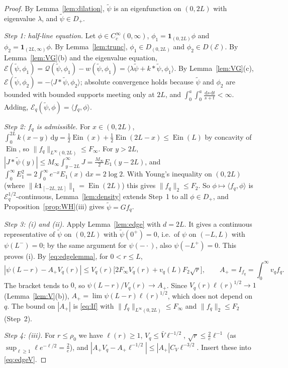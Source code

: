 \documentclass[11pt]{amsart}
\newcommand{\E}{\mathcal{E}}
\newcommand{\one}{\mathbf{1}}
\newcommand{\dd}{\,\mathrm{d}}
\DeclareMathOperator{\Ein}{Ein}
\theoremstyle{definition}
\theoremstyle{remark}
\numberwithin{equation}{section}
\begin{document}
\begin{proof}
By Lemma~\ref{lem:dilation}, $\tilde\psi$ is an eigenfunction on $(0,2L)$ with eigenvalue $\lambda$, and $\tilde\psi\in D_+$.

\emph{Step 1: half-line equation.} Let $\phi\in C_c^\infty(0,\infty)$, $\phi_1=\one_{(0,2L)}\phi$ and $\phi_2=\one_{(2L,\infty)}\phi$. By Lemma~\ref{lem:trunc}, $\phi_1\in D_{(0,2L)}$ and $\phi_2\in D(\E)$. By Lemma~\ref{lem:VG}(b) and the eigenvalue equation, $\E(\tilde\psi,\phi_1)=\mathcal Q(\tilde\psi,\phi_1)-w(\tilde\psi,\phi_1)=\langle\lambda\tilde\psi+k*\tilde\psi,\phi_1\rangle$. By Lemma~\ref{lem:VG}(c), $\E(\tilde\psi,\phi_2)=-\langle J*\tilde\psi,\phi_2\rangle$; absolute convergence holds because $\tilde\psi$ and $\phi_2$ are bounded with bounded supports meeting only at $2L$, and $\int_0^a\!\int_0^a\frac{\dd s\dd t}{s+t}<\infty$. Adding, $\E_q(\tilde\psi,\phi)=\langle f_q,\phi\rangle$.

\emph{Step 2: $f_q$ is admissible.} For $x\in(0,2L)$, $\int_0^{2L}k(x-y)\dd y=\frac12\Ein(x)+\frac12\Ein(2L-x)\le\Ein(L)$ by concavity of $\Ein$, so $\|f_q\|_{L^\infty(0,2L)}\le F_\infty$. For $y>2L$, $|J*\tilde\psi(y)|\le M_\infty\int_{y-2L}^\infty J=\frac{M_\infty}2E_1(y-2L)$, and $\int_0^\infty E_1^2=2\int_0^\infty e^{-x}E_1(x)\dd x=2\log2$. With Young's inequality on $(0,2L)$ (where $\|k\one_{[-2L,2L]}\|_1=\Ein(2L)$) this gives $\|f_q\|_2\le F_2$. So $\phi\mapsto\langle f_q,\phi\rangle$ is $\E_q^{1/2}$-continuous, Lemma~\ref{lem:density} extends Step~1 to all $\phi\in D_+$, and Proposition~\ref{prop:WH}(iii) gives $\tilde\psi=Gf_q$.

\emph{Step 3: (i) and (ii).} Apply Lemma~\ref{lem:edge} with $d=2L$. It gives a continuous representative of $\tilde\psi$ on $(0,2L)$ with $\tilde\psi(0^+)=0$, i.e.\ of $\psi$ on $(-L,L)$ with $\psi(L^-)=0$; by the same argument for $\psi(-\cdot)$, also $\psi(-L^+)=0$. This proves (i). By \eqref{eq:edgelemma}, for $0<r\le L$,
\begin{equation}\label{eq:edgeV}
|\psi(L-r)-A_+V_q(r)|\le V_q(r)\bigl[2F_\infty V_q(r)+v_q(L)F_2\sqrt r\bigr],\qquad A_+=I_{f_q}=\int_0^\infty v_qf_q .
\end{equation}
The bracket tends to $0$, so $\psi(L-r)/V_q(r)\to A_+$. Since $V_q(r)\ell(r)^{1/2}\to1$ (Lemma~\ref{lem:V}(b)), $A_+=\lim\psi(L-r)\ell(r)^{1/2}$, which does not depend on $q$. The bound on $|A_+|$ is \eqref{eq:If} with $\|f_q\|_{L^\infty(0,2L)}\le F_\infty$ and $\|f_q\|_2\le F_2$ (Step~2).

\emph{Step 4: (iii).} For $r\le\rho_0$ we have $\ell(r)\ge1$, $V_q\le\bar V\ell^{-1/2}$, $\sqrt r\le\frac2e\ell^{-1}$ (as $\sup_{\ell\ge1}\ell e^{-\ell/2}=\frac2e$), and $|A_+V_q-A_+\ell^{-1/2}|\le|A_+|C_V\ell^{-3/2}$. Insert these into \eqref{eq:edgeV}.
\end{proof}
\end{document}
